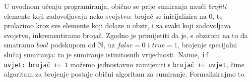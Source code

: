 



U uvodnom učenju programiranja, obično se prije sumiranja nauči \emph{brojiti} elemente koji zadovoljavaju neko svojstvo: brojač se inicijalizira na $0$, te prolazimo kroz sve elemente koji dolaze u obzir, i za svaki koji zadovoljava svojstvo, inkrementiramo brojač. Zgodno je primijetiti da je, s obzirom na to da smatramo $bool$ podskupom od ${\mathbb N}$, uz $\mathit{false}=0$ i $\mathit{true}=1$, brojenje specijalni slučaj sumiranja: to je sumiranje istinitosnih vrijednosti. Naime, \texttt{if uvjet:\ brojač += 1} možemo jednostavno zamijeniti s \texttt{brojač += uvjet}, čime algoritam za brojenje postaje obični algoritam za sumiranje. Formalizirajmo to.

